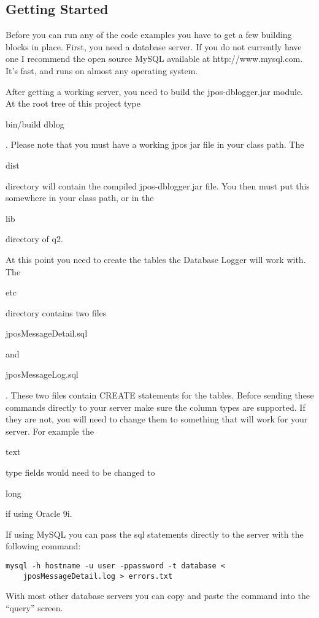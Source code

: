 \documentclass[11pt]{report}
\begin{document}
\begin{flushleft}
\chapter{Getting Started}
    Before you can run any of the code examples you have to get a few building
    blocks in place.  First, you need a database server.  If you do not
    currently have one I recommend the open source MySQL available at
    http://www.mysql.com.  It's fast, and runs on almost any operating system.
    
    After getting a working server, you need to build the jpos-dblogger.jar
    module.  At the root tree of this project type \begin{slshape}bin/build
    dblog\end{slshape}.  Please note that you must have a working
    jpos jar file in your class path. The \begin{slshape}dist\end{slshape}
    directory will contain the compiled jpos-dblogger.jar file.  You then must
    put this somewhere in your class path, or in the
    \begin{slshape}lib\end{slshape} directory of q2.

    At this point you need to create the tables the Database Logger will work
    with.  The \begin{slshape}etc\end{slshape} directory contains two files
    \begin{bf}jposMessageDetail.sql\end{bf} and
    \begin{bf}jposMessageLog.sql\end{bf}.  These two files contain CREATE
    statements for the tables.  Before sending these commands directly to your
    server make sure the column types are supported.  If they are not, you
    will need to change them to something that will work for your server.  For
    example the \begin{bf}text\end{bf} type fields would need to be changed to
    \begin{bf}long\end{bf} if using Oracle 9i.

    If using MySQL you can pass the sql statements directly to the server with
    the following command: 
    \begin{verbatim}mysql -h hostname -u user -ppassword -t database <
    jposMessageDetail.log > errors.txt \end{verbatim}
    With most other database servers you can copy and paste the command
    into the ``query'' screen.


\end{flushleft}
\end{document}
